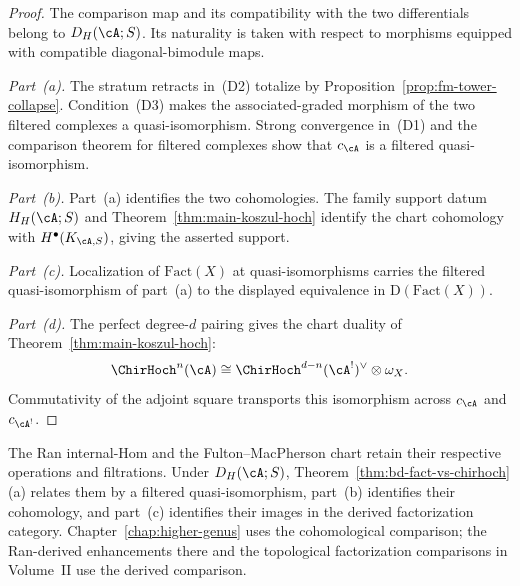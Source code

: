 \begin{proof}
The comparison map and its compatibility with the two differentials
belong to $D_H(\cA;S)$.  Its naturality is taken with respect to
morphisms equipped with compatible diagonal-bimodule maps.

\emph{Part~(a).}\;
The stratum retracts in~(D2) totalize by
Proposition~\ref{prop:fm-tower-collapse}.  Condition~(D3) makes the
associated-graded morphism of the two filtered complexes a
quasi-isomorphism.  Strong convergence in~(D1) and the comparison
theorem for filtered complexes show that $c_\cA$ is a filtered
quasi-isomorphism.

\emph{Part~(b).}\;
Part~(a) identifies the two cohomologies.  The family support datum
$H_H(\cA;S)$ and Theorem~\ref{thm:main-koszul-hoch} identify the chart
cohomology with $H^\bullet(K_{\cA,S})$, giving the asserted support.

\emph{Part~(c).}\;
Localization of $\mathrm{Fact}(X)$ at quasi-isomorphisms carries the
filtered quasi-isomorphism of part~(a) to the displayed equivalence in
$\mathrm D(\mathrm{Fact}(X))$.

\emph{Part~(d).}\;
The perfect degree-$d$ pairing gives the chart duality of
Theorem~\ref{thm:main-koszul-hoch}:
\[
\ChirHoch^n(\cA)
\cong
\ChirHoch^{d-n}(\cA^!)^\vee\otimes\omega_X.
\]
Commutativity of the adjoint square transports this isomorphism across
$c_\cA$ and $c_{\cA^!}$.
\end{proof}

\begin{remark}
\label{rem:bd-fact-chirhoch-two-lanes}
The Ran internal-Hom and the Fulton--MacPherson chart retain their
respective operations and filtrations.  Under $D_H(\cA;S)$,
Theorem~\ref{thm:bd-fact-vs-chirhoch}(a) relates them by a filtered
quasi-isomorphism, part~(b) identifies their cohomology, and part~(c)
identifies their images in the derived factorization category.
Chapter~\ref{chap:higher-genus} uses the cohomological comparison;
the Ran-derived enhancements there and the topological factorization
comparisons in Volume~II use the derived comparison.
\end{remark}

